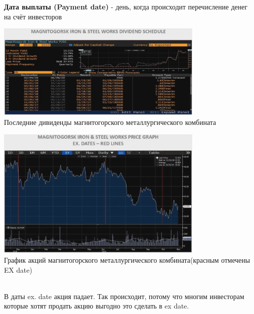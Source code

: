 \documentclass{article}
\begin{document}
{\bf Дата выплаты (Payment date)} - день, когда происходит перечисление денег на счёт инвесторов\\
\begin{center}
\includegraphics[width=0.75\textwidth]{Magnitagorsz.png}\\
{Последние дивиденды магнитогорского металлургического комбината}
\end{center}

\begin{center}
\includegraphics[width=0.75\textwidth]{EX_date.png}\\
{График акций магнитогорского металлургического комбината(красным отмечены EX date)}
\end{center}
\\В даты ex. date акция падает. Так происходит, потому что многим инвесторам которые хотят продать акцию выгодно это сделать в ex date.
\end{document}
